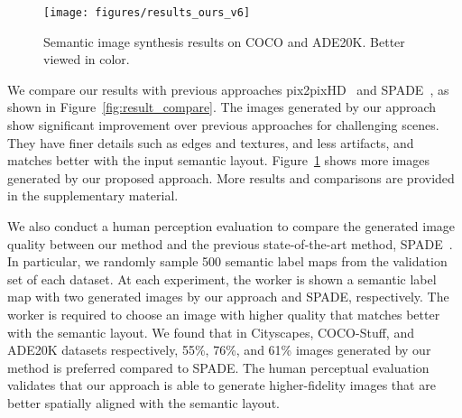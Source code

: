 \documentclass{article}
\begin{document}
\begin{figure}[t]
\centering
\texttt{[image: figures/results\_ours\_v6]}
\caption{Semantic image synthesis results on COCO and ADE20K. Better viewed in color.}
\label{fig:result_ours}
\end{figure}
We compare our results with previous approaches pix2pixHD~\cite{wang2018high} and SPADE~\cite{park2019semantic}, as shown in Figure~\ref{fig:result_compare}.
The images generated by our approach show significant improvement over previous approaches for challenging scenes. 
They have finer details such as edges and textures, and less artifacts, and matches better with the input semantic layout. 
Figure~\ref{fig:result_ours} shows more images generated by our proposed approach. More results and comparisons are provided in the supplementary material.

We also conduct a human perception evaluation to compare the generated image quality between our method and the previous state-of-the-art method, SPADE~\cite{park2019semantic}.
In particular, we randomly sample 500 semantic label maps from the validation set of each dataset.
At each experiment, the worker is shown a semantic label map with two generated images by our approach and SPADE, respectively.
The worker is required to choose an image with higher quality that matches better with the semantic layout.
We found that in Cityscapes, COCO-Stuff, and ADE20K datasets respectively, 55\%, 76\%, and 61\% images generated by our method is preferred compared to SPADE.
The human perceptual evaluation validates that our approach is able to generate higher-fidelity images that are better spatially aligned with the semantic layout.
\end{document}
